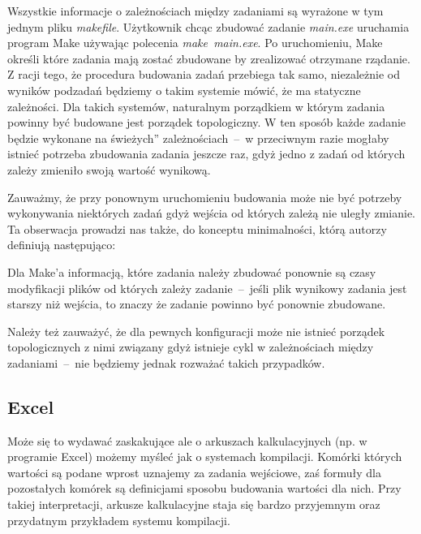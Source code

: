 Wszystkie informacje o zależnościach między zadaniami są wyrażone w tym jednym pliku \textit{makefile}. Użytkownik chcąc zbudować zadanie \textit{main.exe} uruchamia program Make używając polecenia \textit{make~main.exe}. Po uruchomieniu, Make określi które zadania mają zostać zbudowane by zrealizować otrzymane rządanie. Z racji tego, że procedura budowania zadań przebiega tak samo, niezależnie od wyników podzadań będziemy o takim systemie mówić, że ma statyczne zależności. Dla takich systemów, naturalnym porządkiem w którym zadania powinny być budowane jest porządek topologiczny. W ten sposób każde zadanie będzie wykonane na świeżych'' zależnościach~--~w przeciwnym razie mogłaby istnieć potrzeba zbudowania zadania jeszcze raz, gdyż jedno z zadań od których zależy zmieniło swoją wartość wynikową.

Zauważmy, że przy ponownym uruchomieniu budowania może nie być potrzeby wykonywania niektórych zadań gdyż wejścia od których zależą nie uległy zmianie. Ta obserwacja prowadzi nas także, do konceptu minimalności, którą autorzy definiują następująco:


Dla Make'a informacją, które zadania należy zbudować ponownie są czasy modyfikacji plików od których zależy zadanie~--~jeśli plik wynikowy zadania jest starszy niż wejścia, to znaczy że zadanie powinno być ponownie zbudowane.

Należy też zauważyć, że dla pewnych konfiguracji może nie istnieć porządek topologicznych z nimi związany gdyż istnieje cykl w zależnościach między zadaniami~--~nie będziemy jednak rozważać takich przypadków.

\subsection{Excel}

Może się to wydawać zaskakujące ale o arkuszach kalkulacyjnych (np. w programie Excel) możemy myśleć jak o systemach kompilacji. Komórki których wartości są podane wprost uznajemy za zadania wejściowe, zaś formuły dla pozostałych komórek są definicjami sposobu budowania wartości dla nich. Przy takiej interpretacji, arkusze kalkulacyjne staja się bardzo przyjemnym oraz przydatnym przykładem systemu kompilacji.

